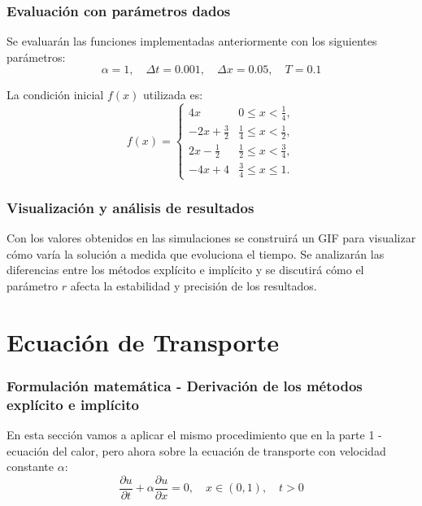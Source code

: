 \documentclass[12pt,a4paper]{article}
\begin{document}
\section{Evaluación con parámetros dados}

Se evaluarán las funciones implementadas anteriormente con los siguientes parámetros:
\[
\alpha = 1, \quad \Delta t = 0.001, \quad \Delta x = 0.05, \quad T = 0.1
\]

La condición inicial $f(x)$ utilizada es:
\[
f(x) =
\begin{cases}
4x & 0 \leq x < \tfrac{1}{4}, \\
-2x + \tfrac{3}{2} & \tfrac{1}{4} \leq x < \tfrac{1}{2}, \\
2x - \tfrac{1}{2} & \tfrac{1}{2} \leq x < \tfrac{3}{4}, \\
-4x + 4 & \tfrac{3}{4} \leq x \leq 1.
\end{cases}
\]


\section{Visualización y análisis de resultados}

Con los valores obtenidos en las simulaciones se construirá un GIF para visualizar
cómo varía la solución a medida que evoluciona el tiempo. Se analizarán las diferencias entre los métodos explícito e implícito y se discutirá cómo el parámetro $r$ afecta la estabilidad y precisión de los resultados.

\newpage

\part{Ecuación de Transporte}

\section{Formulación matemática - Derivación de los métodos explícito e implícito}

En esta sección vamos a aplicar el mismo procedimiento que en la parte 1 - ecuación del calor, pero ahora sobre la ecuación de transporte con velocidad constante $\alpha$:
\[
\frac{\partial u}{\partial t} + \alpha \frac{\partial u}{\partial x} = 0,
\quad x \in (0,1), \quad t > 0
\]
\end{document}
